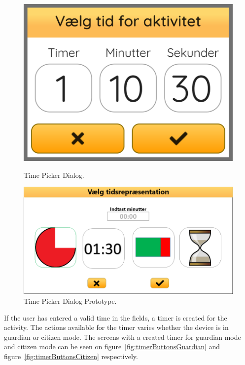 \begin{figure}[H]
\center
{}
  \includegraphics[width=\linewidth]{sections/4Sprint/images/timePicker.png}
  \caption{Time Picker Dialog.}
  \label{fig:timePickerDialog}
\endminipage\hfill \quad
{}
  \includegraphics[width=\linewidth]{sections/4Sprint/images/prototypeTimerPicker.png}
  \caption{Time Picker Dialog Prototype.}
  \label{fig:timePickerPrototype}
\endminipage\hfill
\end{figure}

If the user has entered a valid time in the fields, a timer is created for the activity. 
The actions available for the timer varies whether the device is in guardian or citizen mode. 
The screens with a created timer for guardian mode and citizen mode can be seen on figure~\ref{fig:timerButtonsGuardian} and figure~\ref{fig:timerButtonsCitizen} respectively.

